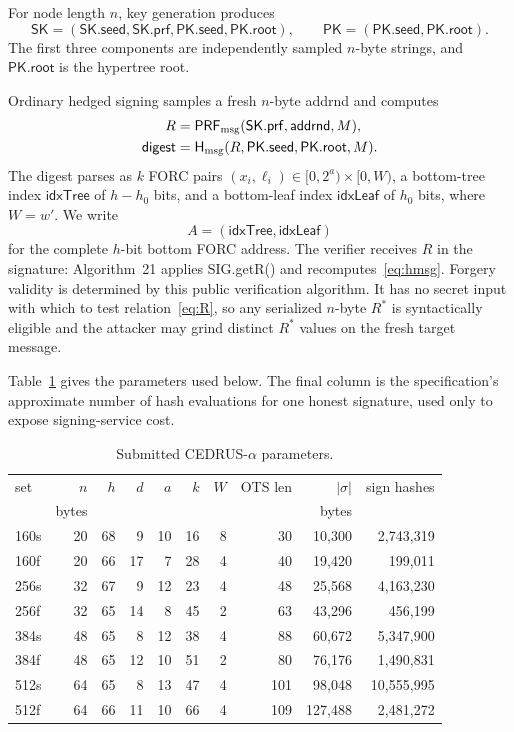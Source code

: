 \documentclass[11pt,a4paper]{article}
\newcommand{\PRFmsg}{\ensuremath{\mathsf{PRF}_{\rm msg}}}
\newcommand{\Hmsg}{\ensuremath{\mathsf{H}_{\rm msg}}}
\newcommand{\pk}{\ensuremath{\mathsf{PK}}}
\newcommand{\sk}{\ensuremath{\mathsf{SK}}}
\begin{document}
For node length $n$, key generation produces
\begin{equation}
 \sk=(\sk.\mathsf{seed},\sk.\mathsf{prf},
      \pk.\mathsf{seed},\pk.\mathsf{root}),\qquad
 \pk=(\pk.\mathsf{seed},\pk.\mathsf{root}).             \label{eq:keys}
\end{equation}
The first three components are independently sampled $n$-byte strings, and
$\pk.\mathsf{root}$ is the hypertree root.

Ordinary hedged signing samples a fresh $n$-byte \textsf{addrnd} and computes
\begin{align}
 R&=\PRFmsg(\sk.\mathsf{prf},\mathsf{addrnd},M),
                                                               \label{eq:R}\\
 \mathsf{digest}&=\Hmsg(R,\pk.\mathsf{seed},
                         \pk.\mathsf{root},M).                 \label{eq:hmsg}
\end{align}
The digest parses as $k$ FORC pairs
$(x_i,\ell_i)\in[0,2^a)\times[0,W)$, a bottom-tree index
$\mathsf{idxTree}$ of $h-h_0$ bits, and a bottom-leaf index
$\mathsf{idxLeaf}$ of $h_0$ bits, where $W=w'$.  We write
\begin{equation}
             A=(\mathsf{idxTree},\mathsf{idxLeaf})             \label{eq:A}
\end{equation}
for the complete $h$-bit bottom FORC address.  The verifier receives $R$ in the
signature: Algorithm~21 applies \textsf{SIG.getR()} and
recomputes~\eqref{eq:hmsg}.  Forgery validity is determined by this public
verification algorithm.  It has no secret input with which to test
relation~\eqref{eq:R}, so any serialized $n$-byte $R^*$ is syntactically
eligible and the attacker may grind distinct $R^*$ values on the fresh target
message.

Table~\ref{tab:params} gives the parameters used below.  The final column is
the specification's approximate number of hash evaluations for one honest
signature, used only to expose signing-service cost.

\begin{table}[ht]
\centering
\small
\caption{Submitted CEDRUS-$\alpha$ parameters.}
\label{tab:params}
\begin{tabular}{lrrrrrrrrr}
\toprule
set & $n$ & $h$ & $d$ & $a$ & $k$ & $W$ & OTS len & $|\sigma|$ & sign hashes\\
 & bytes &&&&&&& bytes & \\
\midrule
160s &20&68&9 &10&16&8&30 &10,300 &2,743,319\\
160f &20&66&17&7 &28&4&40 &19,420 &199,011\\
256s &32&67&9 &12&23&4&48 &25,568 &4,163,230\\
256f &32&65&14&8 &45&2&63 &43,296 &456,199\\
384s &48&65&8 &12&38&4&88 &60,672 &5,347,900\\
384f &48&65&12&10&51&2&80 &76,176 &1,490,831\\
512s &64&65&8 &13&47&4&101&98,048 &10,555,995\\
512f &64&66&11&10&66&4&109&127,488&2,481,272\\
\bottomrule
\end{tabular}
\end{table}
\end{document}
